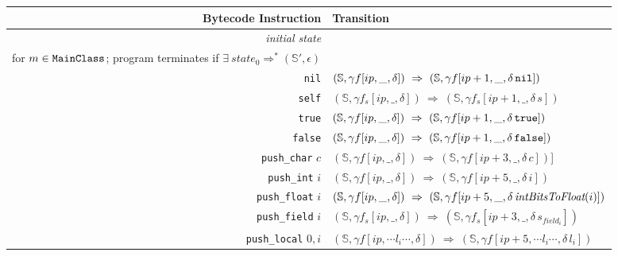 \documentclass[11pt]{article}
\begin{document}
\begin{figure}
\begin{center}
\begin{tabular}[t]{r | l}
{\bf Bytecode Instruction} & {\bf Transition} \\
\hline
{\em initial state} &
\begin{minipage}[t]{.7\linewidth}
$state_0 = (\mathbb{S}[\text{\tt Transcript}], \text{\tt main}_{m}[0,\epsilon,\epsilon])$\\
for $m \in \text{\tt MainClass}$; program terminates if $\exists~ state_0 \Rightarrow^* (\mathbb{S'}, \epsilon)$ 
\end{minipage}\\
\hline
{\tt nil}  & $(\mathbb{S}, \gamma f[ip,\_,\delta]) ~\Rightarrow~ (\mathbb{S}, \gamma f[ip+1,\_,\delta\, \text{\tt nil}])$\\

{\tt self} & $(\mathbb{S},\gamma f_s[ip,\_,\delta]) ~\Rightarrow~ (\mathbb{S},\gamma f_s[ip+1,\_,\delta \,s])$ \\

{\tt true} & $(\mathbb{S},\gamma f[ip,\_,\delta]) ~\Rightarrow~ (\mathbb{S},\gamma f[ip+1,\_,\delta \,\text{\tt true}])$\\

{\tt false} & $(\mathbb{S},\gamma f[ip,\_,\delta]) ~\Rightarrow~ (\mathbb{S},\gamma f[ip+1,\_,\delta \,\text{\tt false}])$\\

{\tt push\_char} $c$ & $(\mathbb{S},\gamma f[ip,\_,\delta]) ~\Rightarrow~ (\mathbb{S},\gamma f[ip+3,\_,\delta \,c])$]\\

{\tt push\_int} $i$ & $(\mathbb{S},\gamma f[ip,\_,\delta]) ~\Rightarrow~ (\mathbb{S},\gamma f[ip+5,\_,\delta \,i])$\\

{\tt push\_float} $i$ & $(\mathbb{S},\gamma f[ip,\_,\delta]) ~\Rightarrow~ (\mathbb{S},\gamma f[ip+5,\_,\delta \, \text{\em intBitsToFloat}(i)])$\\

{\tt push\_field} $i$ & $(\mathbb{S},\gamma f_s[ip,\_,\delta]) ~\Rightarrow~ (\mathbb{S}, \gamma f_s[ip+3,\_,\delta \,s_{field_i}])$ \\

{\tt push\_local} $0, i$ & $(\mathbb{S},\gamma f[ip,\cdots l_i \cdots,\delta]) ~\Rightarrow~ (\mathbb{S},\gamma f[ip+5,\cdots l_i\cdots,\delta \,l_i])$\\


\end{tabular}
\end{center}
\end{figure}
\end{document}
